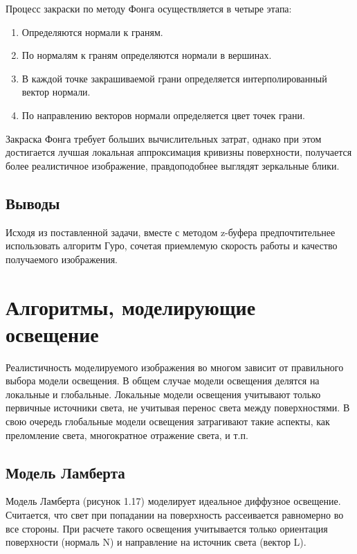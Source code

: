 \documentclass[12pt,a4paper,oneside]{report}
\begin{document}
	 Процесс закраски по методу Фонга осуществляется в четыре этапа: 
	\begin{enumerate}
		\item Определяются нормали к граням.
		\item По нормалям к граням определяются нормали в вершинах.
		\item В каждой точке закрашиваемой грани определяется интерполированный вектор нормали.
		\item По направлению векторов нормали определяется цвет точек грани. 
	\end{enumerate}

	 Закраска Фонга требует больших вычислительных затрат, однако при этом достигается лучшая локальная аппроксимация кривизны поверхности, получается более реалистичное изображение, правдоподобнее выглядят зеркальные блики.
	
	\subsection{Выводы}
	 \quad Исходя из поставленной задачи, вместе с методом z-буфера предпочтительнее использовать алгоритм Гуро, сочетая приемлемую скорость работы и качество получаемого изображения.
		
	\section{Алгоритмы, моделирующие освещение}
	
	 \quad Реалистичность моделируемого изображения во многом зависит от правильного выбора модели освещения. В общем случае модели освещения делятся на локальные и глобальные. Локальные модели освещения учитывают только первичные источники света, не учитывая перенос света между поверхностями. В свою очередь глобальные модели освещения затрагивают такие аспекты, как преломление света, многократное отражение света, и т.п. 
	
	\subsection{Модель Ламберта}
	
	\quad Модель Ламберта (рисунок 1.17) моделирует идеальное диффузное освещение. Считается, что свет при попадании на поверхность рассеивается равномерно во все стороны. При расчете такого освещения учитывается только ориентация поверхности (нормаль N) и направление на источник света (вектор L).  
	
\end{document}
